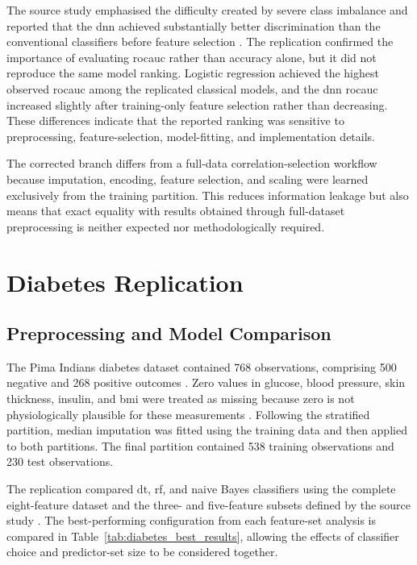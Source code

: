 The source study emphasised the difficulty created by severe class imbalance and reported that the \gls{dnn} achieved substantially better discrimination than the conventional classifiers before feature selection \citep{wu_machine_2024}. The replication confirmed the importance of evaluating \gls{rocauc} rather than accuracy alone, but it did not reproduce the same model ranking. Logistic regression achieved the highest observed \gls{rocauc} among the replicated classical models, and the \gls{dnn} \gls{rocauc} increased slightly after training-only feature
selection rather than decreasing. These differences indicate that the reported ranking was sensitive to preprocessing, feature-selection, model-fitting, and implementation details.

The corrected branch differs from a full-data correlation-selection workflow because imputation, encoding, feature selection, and scaling were learned exclusively from the training partition. This reduces information leakage but also means that exact equality with results obtained through full-dataset preprocessing is neither expected nor methodologically required.

\section{Diabetes Replication}

\subsection{Preprocessing and Model Comparison}

The Pima Indians diabetes dataset contained 768 observations, comprising 500 negative and 268 positive outcomes \citep{chang_pima_2023}. Zero values in glucose, blood pressure, skin thickness, insulin, and \gls{bmi} were treated as missing because zero is not physiologically plausible for these measurements \citep{chang_pima_2023}. Following the stratified partition, median imputation was fitted using the training data and then applied to both partitions. The final partition contained 538 training observations and 230 test observations.

The replication compared \gls{dt}, \gls{rf}, and naive Bayes classifiers using the complete eight-feature dataset and the three- and five-feature subsets defined by the source study \citep{chang_pima_2023}. The best-performing configuration from each feature-set analysis is compared in Table~\ref{tab:diabetes_best_results}, allowing the effects of classifier choice and predictor-set size to be considered together.

